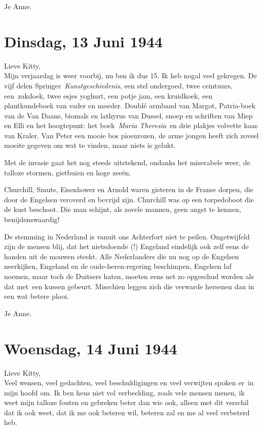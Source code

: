 \documentclass{book}
\begin{document}
Je Anne.

\section*{Dinsdag, 13 Juni 1944}

Lieve Kitty,\\
Mijn verjaardag is weer voorbij, nu ben ik dus 15. Ik heb nogal
veel gekregen. De vijf delen Springer~\emph{Kunstgeschiedenis}, een stel
ondergoed, twee ceintuurs, een~zakdoek, twee esjes yoghurt, een potje jam, een
kruidkoek, een plantkundeboek van vader en moeder. Doublé armband van Margot,
Patria-boek van de Van Daans, biomals en lathyrus van Dussel, snoep en schriften
van Miep en Elli en het hoogtepunt: het boek~\emph{Maria Theresia}~en drie
plakjes volvette kaas van Kraler. Van Peter een mooie bos pioenrozen, de arme
jongen heeft zich zoveel moeite gegeven om wat te vinden, maar niets is gelukt.

Met de invasie gaat het nog steeds uitstekend, ondanks het miserabele weer, de
talloze stormen, gietbuien en hoge zeeën.

Churchill, Smuts, Eisenhower en Arnold waren gisteren in de Franse dorpen, die
door de Engelsen veroverd en bevrijd zijn. Churchill was op een torpedoboot die
de kust beschoot. Die man schijnt, als zovele mannen, geen angst te kennen,
benijdenswaardig!

De stemming in Nederland is vanuit ons Achterfort niet te peilen.  Ongetwijfeld
zijn de mensen blij, dat het nietsdoende (!) Engeland eindelijk ook zelf eens de
handen uit de mouwen steekt. Alle Nederlanders die nu nog op de Engelsen
neerkijken, Engeland en de oude-heren-regering beschimpen, Engelsen laf noemen,
maar toch de Duitsers haten, moeten eens net zo opgeschud worden als dat met~een
kussen gebeurt. Misschien leggen zich die verwarde hersenen dan in een wat
betere plooi.

Je Anne.

\section*{Woensdag, 14 Juni 1944}

Lieve Kitty,\\
Veel wensen, veel gedachten, veel beschuldigingen en veel
verwijten spoken er~in mijn hoofd om. Ik ben heus niet vol verbeelding, zoals
vele mensen menen, ik weet mijn talloze fouten en gebreken beter dan wie ook,
alleen met dit verschil dat ik ook weet, dat ik me ook beteren wil, beteren zal
en me al veel verbeterd heb.
\end{document}
